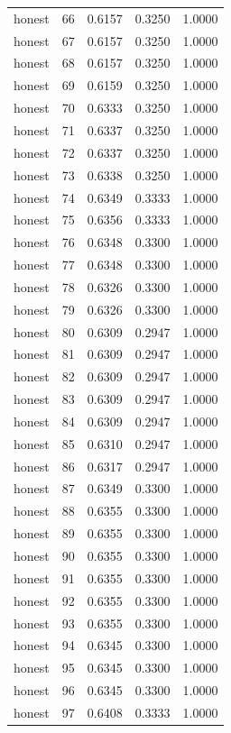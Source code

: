 \begin{tabular}{lrrrr}
honest & 66 & 0.6157 & 0.3250 & 1.0000 \\
honest & 67 & 0.6157 & 0.3250 & 1.0000 \\
honest & 68 & 0.6157 & 0.3250 & 1.0000 \\
honest & 69 & 0.6159 & 0.3250 & 1.0000 \\
honest & 70 & 0.6333 & 0.3250 & 1.0000 \\
honest & 71 & 0.6337 & 0.3250 & 1.0000 \\
honest & 72 & 0.6337 & 0.3250 & 1.0000 \\
honest & 73 & 0.6338 & 0.3250 & 1.0000 \\
honest & 74 & 0.6349 & 0.3333 & 1.0000 \\
honest & 75 & 0.6356 & 0.3333 & 1.0000 \\
honest & 76 & 0.6348 & 0.3300 & 1.0000 \\
honest & 77 & 0.6348 & 0.3300 & 1.0000 \\
honest & 78 & 0.6326 & 0.3300 & 1.0000 \\
honest & 79 & 0.6326 & 0.3300 & 1.0000 \\
honest & 80 & 0.6309 & 0.2947 & 1.0000 \\
honest & 81 & 0.6309 & 0.2947 & 1.0000 \\
honest & 82 & 0.6309 & 0.2947 & 1.0000 \\
honest & 83 & 0.6309 & 0.2947 & 1.0000 \\
honest & 84 & 0.6309 & 0.2947 & 1.0000 \\
honest & 85 & 0.6310 & 0.2947 & 1.0000 \\
honest & 86 & 0.6317 & 0.2947 & 1.0000 \\
honest & 87 & 0.6349 & 0.3300 & 1.0000 \\
honest & 88 & 0.6355 & 0.3300 & 1.0000 \\
honest & 89 & 0.6355 & 0.3300 & 1.0000 \\
honest & 90 & 0.6355 & 0.3300 & 1.0000 \\
honest & 91 & 0.6355 & 0.3300 & 1.0000 \\
honest & 92 & 0.6355 & 0.3300 & 1.0000 \\
honest & 93 & 0.6355 & 0.3300 & 1.0000 \\
honest & 94 & 0.6345 & 0.3300 & 1.0000 \\
honest & 95 & 0.6345 & 0.3300 & 1.0000 \\
honest & 96 & 0.6345 & 0.3300 & 1.0000 \\
honest & 97 & 0.6408 & 0.3333 & 1.0000 \\

\end{tabular}
